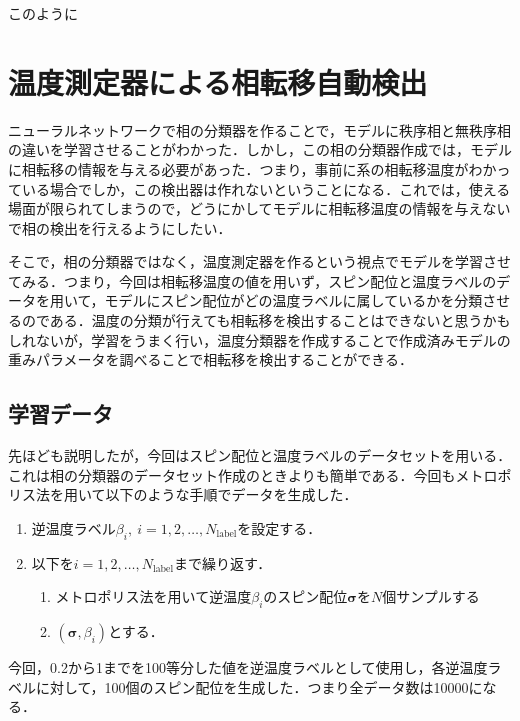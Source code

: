 \documentclass[a4paper,11pt]{jsreport}
\begin{document}
このように






\section{温度測定器による相転移自動検出}
ニューラルネットワークで相の分類器を作ることで，モデルに秩序相と無秩序相の違いを学習させることがわかった．しかし，この相の分類器作成では，モデルに相転移の情報を与える必要があった．つまり，事前に系の相転移温度がわかっている場合でしか，この検出器は作れないということになる．これでは，使える場面が限られてしまうので，どうにかしてモデルに相転移温度の情報を与えないで相の検出を行えるようにしたい．\par
そこで，相の分類器ではなく，温度測定器を作るという視点でモデルを学習させてみる．つまり，今回は相転移温度の値を用いず，スピン配位と温度ラベルのデータを用いて，モデルにスピン配位がどの温度ラベルに属しているかを分類させるのである．温度の分類が行えても相転移を検出することはできないと思うかもしれないが，学習をうまく行い，温度分類器を作成することで作成済みモデルの重みパラメータを調べることで相転移を検出することができる．

\subsection{学習データ}
先ほども説明したが，今回はスピン配位と温度ラベルのデータセットを用いる．これは相の分類器のデータセット作成のときよりも簡単である．今回もメトロポリス法を用いて以下のような手順でデータを生成した．\par
\begin{enumerate}
  \item 逆温度ラベル$\beta_i, \ i=1,2,\dots,N_{\text{label}}$を設定する．
  \item 以下を$i=1,2,\dots,N_{\text{label}}$まで繰り返す．
  \begin{enumerate}
    \item メトロポリス法を用いて逆温度$\beta_i$のスピン配位$\bm{\sigma}$を$N$個サンプルする
    \item $(\bm{\sigma},\beta_i)$とする．
  \end{enumerate}
\end{enumerate}
今回，0.2から1までを100等分した値を逆温度ラベルとして使用し，各逆温度ラベルに対して，100個のスピン配位を生成した．つまり全データ数は10000になる．
\end{document}
